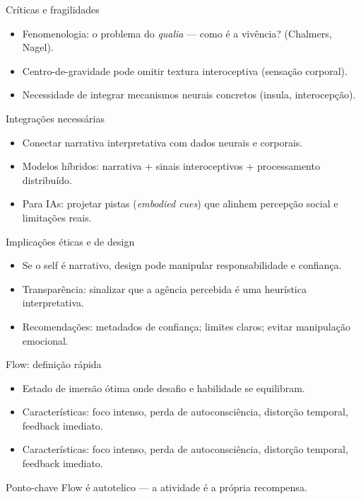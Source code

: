 \documentclass[aspectratio=169,12pt]{beamer}
\begin{document}
\begin{frame}{Críticas e fragilidades}
\begin{itemize}
\item Fenomenologia: o problema do \textit{qualia} — como é a vivência? (Chalmers, Nagel).
\item Centro-de-gravidade pode omitir textura interoceptiva (sensação corporal).
\item Necessidade de integrar mecanismos neurais concretos (insula, interocepção).
\end{itemize}
\end{frame}


\begin{frame}{Integrações necessárias}
\begin{itemize}
\item Conectar narrativa interpretativa com dados neurais e corporais.
\item Modelos híbridos: narrativa + sinais interoceptivos + processamento distribuído.
\item Para IAs: projetar pistas (\textit{embodied cues}) que alinhem percepção social e limitações reais.
\end{itemize}
\end{frame}
\begin{frame}{Implicações éticas e de design}
\begin{itemize}
\item Se o self é narrativo, design pode manipular responsabilidade e confiança.
\item Transparência: sinalizar que a agência percebida é uma heurística interpretativa.
\item Recomendações: metadados de confiança; limites claros; evitar manipulação emocional.
\end{itemize}
\end{frame}


\begin{frame}{Flow: definição rápida}
  \begin{itemize}
    \item Estado de imersão ótima onde desafio e habilidade se equilibram.
    \item Características: foco intenso, perda de autoconsciência, distorção temporal, feedback imediato. 
    \item Características: foco intenso, perda de autoconsciência, distorção temporal, feedback imediato. \faBolt
  \end{itemize}
    \begin{exampleblock}{Ponto-chave}
        Flow é autotelico — a atividade é a própria recompensa.
    \end{exampleblock}
\end{frame}
\end{document}
